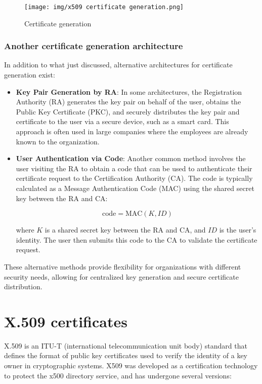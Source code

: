 \begin{figure}[h]
  \centering
  \texttt{[image: img/x509 certificate
  generation.png]}
  \caption{Certificate generation}
\end{figure}

\subsubsection{Another certificate generation architecture}

In addition to what just discussed, alternative architectures for
certificate generation exist:

\begin{itemize}
  \item \textbf{Key Pair Generation by RA}: In some architectures, the
    Registration Authority (RA) generates the key pair on behalf of
    the user, obtains the Public Key Certificate (PKC), and securely
    distributes the key pair and certificate to the user via a
    secure device, such as a smart card. This approach is often used
    in large companies where the employees are already known to the
    organization.

  \item \textbf{User Authentication via Code}: Another common method
    involves the user visiting the RA to obtain a code that can be
    used to authenticate their certificate request to the
    Certification Authority (CA). The code is typically calculated
    as a Message Authentication Code (MAC) using the shared secret
    key between the RA and CA:

    \[
      \text{code} = \text{MAC}(K, ID)
    \]

    where \(K\) is a shared secret key between the RA and CA, and
    \(ID\) is the user's identity. The user then submits this code to
    the CA to validate the certificate request.
\end{itemize}

These alternative methods provide flexibility for organizations with
different security needs, allowing for centralized key generation and
secure certificate distribution.

\section{X.509 certificates}

X.509 is an ITU-T (international telecommunication unit body) standard
that defines the format of public key certificates used to verify the
identity of a key owner in cryptographic systems. X509 was developed
as a certification technology to protect the x500 directory service,
and has undergone several versions:

